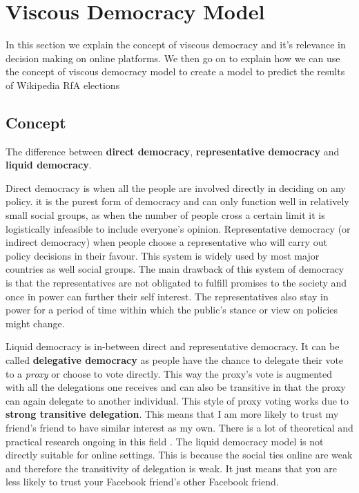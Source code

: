\section{Viscous Democracy Model}
\label{sec:model}
In this section we explain the concept of viscous democracy \cite{ViscousDemocracy} and it's relevance in decision making on online platforms. We then go on to explain how we can use the concept of viscous democracy model to create a model to predict the results of Wikipedia RfA elections

\subsection{Concept}
The difference between \textbf{direct democracy}, \textbf{representative democracy} and \textbf{liquid democracy}.
\smallskip

Direct democracy is when all the people are involved directly in deciding on any policy. it is the purest form of democracy and can only function well in relatively small social groups, as when the number of people cross a certain limit it is logistically infeasible to include everyone's opinion. Representative democracy (or indirect democracy) when people choose a representative who will carry out policy decisions in their favour. This system is widely used by most major countries as well social groups. The main drawback of this system of democracy is that the representatives are not obligated to fulfill promises to the society and once in power can further their self interest. The representatives also stay in power for a period of time within which the public's stance or view on policies might change.
\smallskip

Liquid democracy is in-between direct and representative democracy. It can be called \textbf{delegative democracy} as people have the chance to delegate their vote to a \textit{proxy} or choose to vote directly. This way the proxy's vote is augmented with all the delegations one receives and can also be transitive in that the proxy can again delegate to another individual. This style of proxy voting works due to \textbf{strong transitive delegation}. This means that I am more likely to trust my friend's friend to have similar interest as my own. There is a lot of theoretical and practical research ongoing in this field \cite{kahng2018liquid,hardt2015google}. The liquid democracy model is not directly suitable for online settings. This is because the social ties online are weak and therefore the transitivity of delegation is weak. It just means that you are less likely to trust your Facebook friend's other Facebook friend. 
\smallskip

